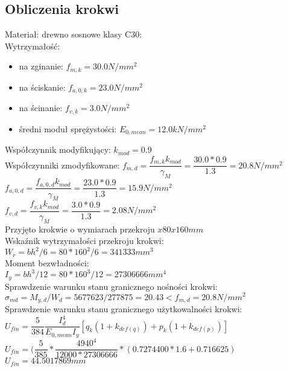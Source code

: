 \documentclass[12pt,a4paper]{article}
\begin{document}
\subsection{Obliczenia krokwi}
Materiał: drewno sosnowe klasy C30:\\
Wytrzymałość:
\begin{itemize}
	\item na zginanie: $f_{m,k}=30.0N/mm^2$
	\item na ściskanie: $f_{a,0,k} = 23.0N/mm^2$
	\item na ścinanie: $f_{v,k}=3.0N/mm^2$
	\item średni moduł sprężystości: $E_{0,mean}=12.0kN/mm^2$
\end{itemize}
Współczynnik modyfikujący: $k_{mod}=0.9$\\
Współczynniki zmodyfikowane:
$f_{m,d}=\dfrac{f_{m,k}k_{mod}}{\gamma_M}=\dfrac{30.0*0.9}{1.3}=20.8N/mm^2$\\
$f_{a,0,d}=\dfrac{f_{a,0,d}k_{mod}}{\gamma_M}=\dfrac{23.0*0.9}{1.3}=15.9N/mm^2$\\
$f_{v,d}=\dfrac{f_{v,k}k_{mod}}{\gamma_M}=\dfrac{3.0*0.9}{1.3}=2.08N/mm^2$\\
Przyjęto krokwie o wymiarach przekroju $x80x160mm$\\
Wskaźnik wytrzymałości przekroju krokwi:\\
$W_r = bh^2/6 = 80*160^2 /6 = 341333 mm^3$\\
Moment bezwładności:\\
$I_y = bh^3/12 = 80 * 160^3 /12 = 27306666 mm^4$\\
Sprawdzenie warunku stanu granicznego nośności krokwi:\\
$\sigma_{md} = M_{y,d}/W_d = 5677623/277875=20.43<f_{m,d}=20.8N/mm^2$\\
Sprawdzenie warunku stanu granicznego użytkowalności krokwi:\\
$U_{fin}=\dfrac{5}{384}\dfrac{I_d^4}{E_{0,mean}I_y}\left[q_k\left(1+k_{def(q)}\right)+p_k\left(1+k_{def(p)}\right)\right]$\\
$U_{fin}=(\dfrac{5}{385}*\dfrac{4940^4}{12000*27306666}*(0.7274400*1.6 + 0.716625)$\\
$U_{fin}=44.5017869mm$
\end{document}
